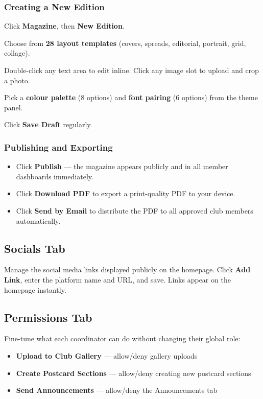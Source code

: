 \documentclass[12pt,a4paper]{article}
\begin{document}
\subsubsection{Creating a New Edition}
\begin{steps}
\item Click \textbf{Magazine}, then \textbf{New Edition}.
\item Choose from \textbf{28 layout templates} (covers, spreads, editorial, portrait, grid, collage).
\item Double-click any text area to edit inline. Click any image slot to upload and crop a photo.
\item Pick a \textbf{colour palette} (8 options) and \textbf{font pairing} (6 options) from the theme panel.
\item Click \textbf{Save Draft} regularly.
\end{steps}

\subsubsection{Publishing and Exporting}
\begin{itemize}
  \item Click \textbf{Publish} --- the magazine appears publicly and in all member dashboards immediately.
  \item Click \textbf{Download PDF} to export a print-quality PDF to your device.
  \item Click \textbf{Send by Email} to distribute the PDF to all approved club members automatically.
\end{itemize}

\subsection{Socials Tab}

Manage the social media links displayed publicly on the homepage. Click \textbf{Add Link}, enter the platform name and URL, and save. Links appear on the homepage instantly.

\subsection{Permissions Tab}

Fine-tune what each coordinator can do without changing their global role:

\begin{itemize}
  \item \textbf{Upload to Club Gallery} --- allow/deny gallery uploads
  \item \textbf{Create Postcard Sections} --- allow/deny creating new postcard sections
  \item \textbf{Send Announcements} --- allow/deny the Announcements tab
\end{itemize}
\end{document}
